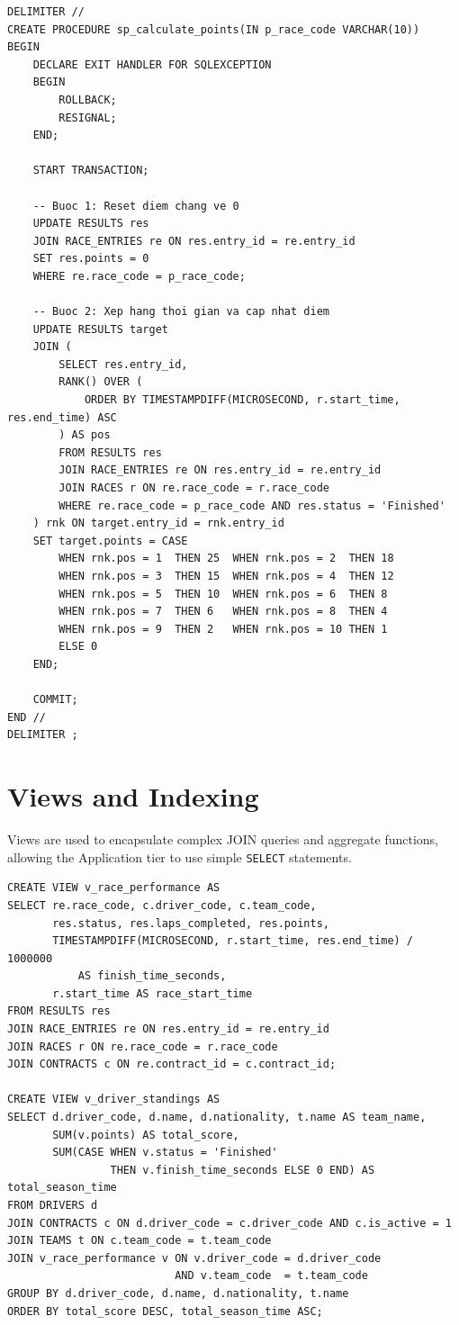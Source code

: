 \documentclass[12pt, a4paper]{report}
\begin{document}
\begin{lstlisting}[caption={Stored Procedure sp\_calculate\_points --- Automatic F1 point calculation}]
DELIMITER //
CREATE PROCEDURE sp_calculate_points(IN p_race_code VARCHAR(10))
BEGIN
    DECLARE EXIT HANDLER FOR SQLEXCEPTION
    BEGIN
        ROLLBACK;
        RESIGNAL;
    END;

    START TRANSACTION;

    -- Buoc 1: Reset diem chang ve 0
    UPDATE RESULTS res
    JOIN RACE_ENTRIES re ON res.entry_id = re.entry_id
    SET res.points = 0
    WHERE re.race_code = p_race_code;

    -- Buoc 2: Xep hang thoi gian va cap nhat diem
    UPDATE RESULTS target
    JOIN (
        SELECT res.entry_id,
        RANK() OVER (
            ORDER BY TIMESTAMPDIFF(MICROSECOND, r.start_time, res.end_time) ASC
        ) AS pos
        FROM RESULTS res
        JOIN RACE_ENTRIES re ON res.entry_id = re.entry_id
        JOIN RACES r ON re.race_code = r.race_code
        WHERE re.race_code = p_race_code AND res.status = 'Finished'
    ) rnk ON target.entry_id = rnk.entry_id
    SET target.points = CASE
        WHEN rnk.pos = 1  THEN 25  WHEN rnk.pos = 2  THEN 18
        WHEN rnk.pos = 3  THEN 15  WHEN rnk.pos = 4  THEN 12
        WHEN rnk.pos = 5  THEN 10  WHEN rnk.pos = 6  THEN 8
        WHEN rnk.pos = 7  THEN 6   WHEN rnk.pos = 8  THEN 4
        WHEN rnk.pos = 9  THEN 2   WHEN rnk.pos = 10 THEN 1
        ELSE 0
    END;

    COMMIT;
END //
DELIMITER ;
\end{lstlisting}

\section{Views and Indexing}
Views are used to encapsulate complex JOIN queries and aggregate functions, allowing the Application tier to use simple \texttt{SELECT} statements.

\begin{lstlisting}[caption={Views --- Driver and Constructor Standings}]
CREATE VIEW v_race_performance AS
SELECT re.race_code, c.driver_code, c.team_code,
       res.status, res.laps_completed, res.points,
       TIMESTAMPDIFF(MICROSECOND, r.start_time, res.end_time) / 1000000 
           AS finish_time_seconds,
       r.start_time AS race_start_time
FROM RESULTS res 
JOIN RACE_ENTRIES re ON res.entry_id = re.entry_id 
JOIN RACES r ON re.race_code = r.race_code 
JOIN CONTRACTS c ON re.contract_id = c.contract_id;

CREATE VIEW v_driver_standings AS
SELECT d.driver_code, d.name, d.nationality, t.name AS team_name,
       SUM(v.points) AS total_score,
       SUM(CASE WHEN v.status = 'Finished' 
                THEN v.finish_time_seconds ELSE 0 END) AS total_season_time
FROM DRIVERS d
JOIN CONTRACTS c ON d.driver_code = c.driver_code AND c.is_active = 1
JOIN TEAMS t ON c.team_code = t.team_code
JOIN v_race_performance v ON v.driver_code = d.driver_code 
                          AND v.team_code  = t.team_code
GROUP BY d.driver_code, d.name, d.nationality, t.name
ORDER BY total_score DESC, total_season_time ASC;
\end{lstlisting}
\end{document}
